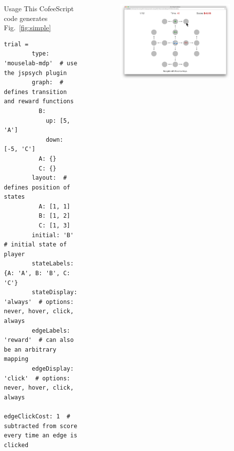 \documentclass[final]{beamer}
\newlength{\sepwid}
\newlength{\onecolwid}
\newlength{\twocolwid}
\begin{document}
\begin{frame}[t, fragile]
\begin{columns}[t]
\begin{column}{\onecolwid}
  \begin{block}{Usage}\label{usage}
    This CofeeScript code generates Fig.~\ref{fig:simple}
    \begin{Verbatim}[fontsize=\tiny]
      trial =
        type: 'mouselab-mdp'  # use the jspsych plugin
        graph:  # defines transition and reward functions
          B:
            up: [5, 'A']
            down: [-5, 'C']
          A: {}
          C: {}
        layout:  # defines position of states
          A: [1, 1]
          B: [1, 2]
          C: [1, 3]
        initial: 'B'  # initial state of player
        stateLabels: {A: 'A', B: 'B', C: 'C'}
        stateDisplay: 'always'  # options: never, hover, click, always
        edgeLabels: 'reward'  # can also be an arbitrary mapping
        edgeDisplay: 'click'  # options: never, hover, click, always
        edgeClickCost: 1  # subtracted from score every time an edge is clicked
    \end{Verbatim}
  \end{block}

\end{column} %

\begin{column}{\sepwid}\end{column} %
\begin{column}{\twocolwid} %

  \begin{figure}
    \label{fig:main}
    \includegraphics[width=0.85\linewidth]{figs/example1.png}
  \end{figure}


\end{column}
\end{columns}
\end{frame}
\end{document}
